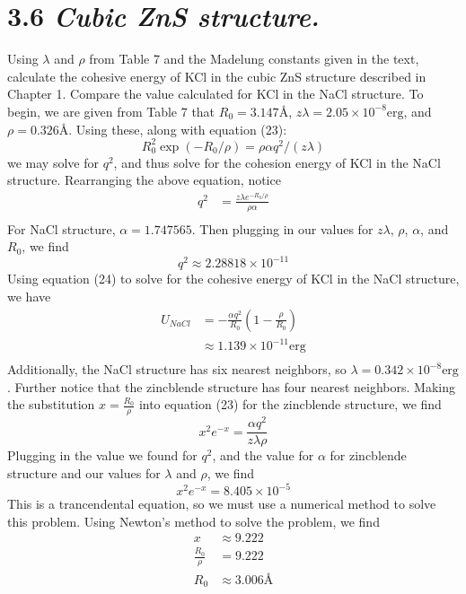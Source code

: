\documentclass{article}
\begin{document}
\section*{3.6 \textit{Cubic ZnS structure.}}
Using $\lambda$ and $\rho$ from Table 7 and the Madelung constants given in the text, calculate the cohesive energy of KCl in the cubic ZnS structure described in Chapter 1. Compare the value calculated for KCl in the NaCl structure.
\newline\newline
To begin, we are given from Table 7 that $R_0 = 3.147 \text{\AA}$, $z\lambda = 2.05 \times 10^{-8} \text{erg}$, and $\rho = 0.326 \text{\AA}$. Using these, along with equation (23):
\[R_0^2 \exp{(-R_0/\rho)} = \rho \alpha q^2/(z\lambda)\]
we may solve for $q^2$, and thus solve for the cohesion energy of KCl in the NaCl structure. Rearranging the above equation, notice
\begin{align*}
    q^2 &= \frac{z\lambda e^{-R_0/\rho}}{\rho \alpha} \\
\end{align*}
For NaCl structure, $\alpha = 1.747565$. Then plugging in our values for $z\lambda$, $\rho$, $\alpha$, and $R_0$, we find
\[q^2 \approx 2.28818 \times 10^{-11}\]
Using equation (24) to solve for the cohesive energy of KCl in the NaCl structure, we have
\begin{align*}
    U_{NaCl} &= -\frac{\alpha q^2}{R_0}\left(1 - \frac{\rho}{R_0}\right) \\
    &\approx 1.139 \times 10^{-11} \text{erg} \\
    \end{align*}
Additionally, the NaCl structure has six nearest neighbors, so $\lambda = 0.342 \times 10^{-8} \text{erg}$. Further notice that the zincblende structure has four nearest neighbors. Making the substitution $x = \frac{R_0}{\rho}$ into equation (23) for the zincblende structure, we find
\[x^2e^{-x} = \frac{\alpha q^2}{z\lambda \rho}\]
Plugging in the value we found for $q^2$, and the value for $\alpha$ for zincblende structure and our values for $\lambda$ and $\rho$, we find
\[x^2e^{-x} = 8.405\times 10^{-5}\]
This is a trancendental equation, so we must use a numerical method to solve this problem. Using Newton's method to solve the problem, we find
\begin{align*}
    x &\approx 9.222 \\
    \frac{R_0}{\rho} &= 9.222 \\
    R_0 &\approx 3.006 \text{\AA} \\
\end{align*}
\end{document}
